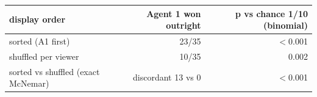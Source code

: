 \begin{tabular}{lrr}
\toprule
\textbf{display order} & \textbf{Agent 1 won outright} & \textbf{p vs chance 1/10 (binomial)} \\
\midrule
sorted (A1 first) & 23/35 & $<$0.001 \\
shuffled per viewer & 10/35 & 0.002 \\
sorted vs shuffled (exact McNemar) & discordant 13 vs 0 & $<$0.001 \\
\bottomrule
\end{tabular}
